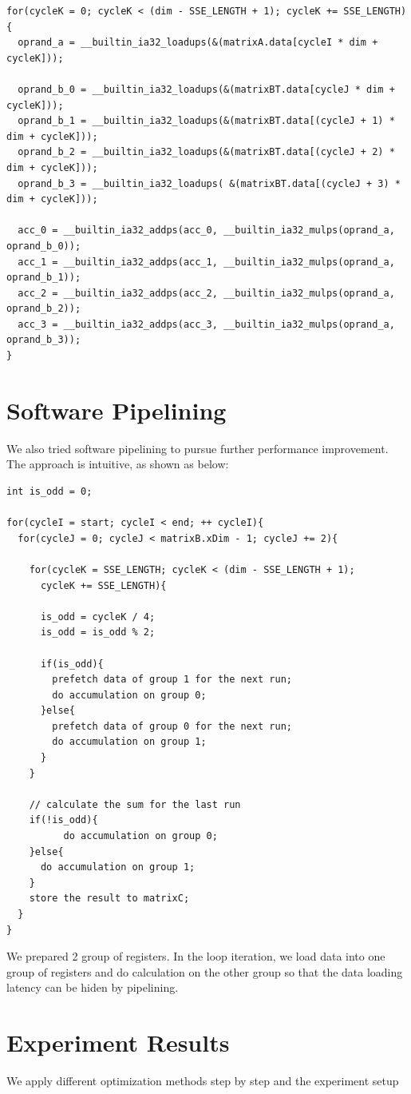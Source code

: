 \documentclass[12pt]{article}
\begin{document}
\footnotesize
\begin{verbatim}
for(cycleK = 0; cycleK < (dim - SSE_LENGTH + 1); cycleK += SSE_LENGTH){
  oprand_a = __builtin_ia32_loadups(&(matrixA.data[cycleI * dim + cycleK]));

  oprand_b_0 = __builtin_ia32_loadups(&(matrixBT.data[cycleJ * dim + cycleK]));
  oprand_b_1 = __builtin_ia32_loadups(&(matrixBT.data[(cycleJ + 1) * dim + cycleK]));
  oprand_b_2 = __builtin_ia32_loadups(&(matrixBT.data[(cycleJ + 2) * dim + cycleK]));
  oprand_b_3 = __builtin_ia32_loadups( &(matrixBT.data[(cycleJ + 3) * dim + cycleK]));
          
  acc_0 = __builtin_ia32_addps(acc_0, __builtin_ia32_mulps(oprand_a, oprand_b_0));
  acc_1 = __builtin_ia32_addps(acc_1, __builtin_ia32_mulps(oprand_a, oprand_b_1));
  acc_2 = __builtin_ia32_addps(acc_2, __builtin_ia32_mulps(oprand_a, oprand_b_2));
  acc_3 = __builtin_ia32_addps(acc_3, __builtin_ia32_mulps(oprand_a, oprand_b_3));
}
\end{verbatim}
\normalsize

\section{Software Pipelining}
We also tried software pipelining to pursue further performance improvement. 
The approach is intuitive, as shown as below:
\footnotesize
\begin{verbatim}
int is_odd = 0;

for(cycleI = start; cycleI < end; ++ cycleI){
  for(cycleJ = 0; cycleJ < matrixB.xDim - 1; cycleJ += 2){

    for(cycleK = SSE_LENGTH; cycleK < (dim - SSE_LENGTH + 1); 
      cycleK += SSE_LENGTH){
      
      is_odd = cycleK / 4;
      is_odd = is_odd % 2;
        
      if(is_odd){
        prefetch data of group 1 for the next run;
        do accumulation on group 0;
      }else{
        prefetch data of group 0 for the next run;
        do accumulation on group 1;
      }
    }
        
    // calculate the sum for the last run
    if(!is_odd){
    	  do accumulation on group 0;
    }else{
      do accumulation on group 1;
    }
    store the result to matrixC;
  }
}
\end{verbatim}
\normalsize

We prepared 2 group of registers. In the loop iteration, we load data 
into one group of registers and do calculation on the other group so that
the data loading latency can be hiden by pipelining.

\section{Experiment Results}
We apply different optimization methods step by step and the experiment setup 
\end{document}
